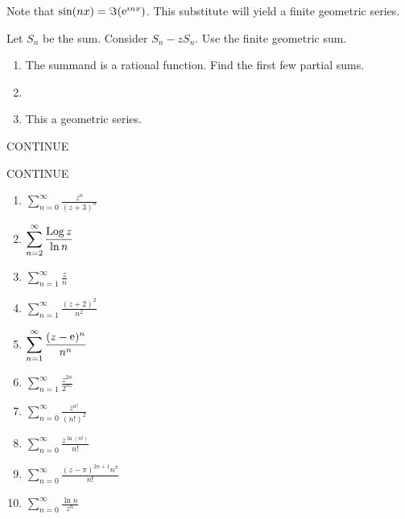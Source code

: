 {%
\begin{Hint}
  \label{hint sum sin nx}
  Note that $\sin(n x) = \Im(\mathop{\mathrm{e}}\nolimits^{\imath n x})$.  This substitute will yield
  a finite geometric series.
\end{Hint}


\begin{Hint}
  \label{hint sum k z^k}
  Let $S_n$ be the sum.  Consider $S_n - z S_n$.  Use the finite geometric sum.
\end{Hint}


\begin{Hint}
  \label{hint sum rational alternate geometric}
  \begin{enumerate}
  \item 
    The summand is a rational function.  Find the first few partial sums.
  \item 
  \item 
    This a geometric series.
  \end{enumerate}
\end{Hint}


\begin{Hint}
  \label{hint sum sum 1/2 k}
  CONTINUE
\end{Hint}









\begin{Hint}
  \label{hint convergence zn / (z+3)n}
  CONTINUE
  \begin{enumerate}
  \item
    $\displaystyle \sum_{n=0}^\infty \frac{z^n}{(z + 3)^n}$
  \item
    $\displaystyle \sum_{n=2}^\infty \frac{\mathop{\mathrm{Log}}\nolimits z}{\ln n}$
  \item
    $\displaystyle \sum_{n=1}^\infty \frac{z}{n}$
  \item
    $\displaystyle \sum_{n=1}^\infty \frac{(z+2)^2}{n^2}$
  \item
    $\displaystyle \sum_{n=1}^\infty \frac{(z - \mathop{\mathrm{e}}\nolimits)^n}{n^n}$
  \item
    $\displaystyle \sum_{n=1}^\infty \frac{z^{2n}}{2^{n z}}$
  \item
    $\displaystyle \sum_{n=0}^\infty \frac{z^{n!}}{(n!)^2}$
  \item
    $\displaystyle \sum_{n=0}^\infty \frac{z^{\ln(n!)}}{n!}$
  \item
    $\displaystyle \sum_{n=0}^\infty \frac{ (z - \pi)^{2 n + 1} n^\pi }{ n! }$
  \item
    $\displaystyle \sum_{n=0}^\infty \frac{ \ln n }{ z^n }$
  \end{enumerate}
\end{Hint}


}
